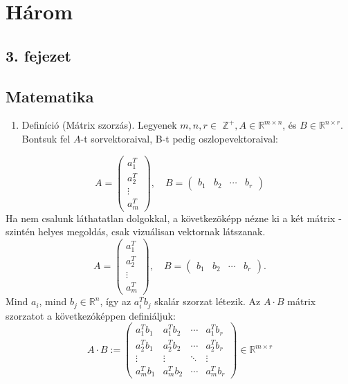 \documentclass[twocolumn]{report}
\theoremstyle{definition} %
\begin{document}
\chapter{Három}

\section{3. fejezet}
\section{Matematika}
\begin{enumerate}
  \item Definíció (Mátrix szorzás). Legyenek $m, n, r \in$ $\mathbb{Z}^{+}, A \in \mathbb{R}^{m \times n}$, és $B \in \mathbb{R}^{n \times r}$. Bontsuk fel $A$-t sorvektoraival, B-t pedig oszlopevektoraival:
\end{enumerate}
$$
A=\left(\begin{array}{c}
a_{1}^{T} \\
a_{2}^{T} \\
\vdots \\
a_{m}^{T}
\end{array}\right), \quad B=\left(\begin{array}{llll}
b_{1} & b_{2} & \cdots & b_{r}
\end{array}\right)
$$
Ha nem csalunk láthatatlan dolgokkal, a következöképp nézne ki a két mátrix - szintén helyes megoldás, csak vizuálisan vektornak látszanak.
$$
A=\left(\begin{array}{c}
a_{1}^{T} \\
a_{2}^{T} \\
\vdots \\
a_{m}^{T}
\end{array}\right), \quad B=\left(\begin{array}{llll}
b_{1} & b_{2} & \cdots & b_{r}
\end{array}\right) .
$$
Mind $a_{i}$, mind $b_{j} \in \mathbb{R}^{n}$, így az $a_{i}^{T} b_{j}$ skalár szorzat létezik. Az $A \cdot B$ mátrix szorzatot a következóképpen definiáljuk:
$$
A \cdot B:=\left(\begin{array}{cccc}
a_{1}^{T} b_{1} & a_{1}^{T} b_{2} & \cdots & a_{1}^{T} b_{r} \\
a_{2}^{T} b_{1} & a_{2}^{T} b_{2} & \cdots & a_{2}^{T} b_{r} \\
\vdots & \vdots & \ddots & \vdots \\
a_{m}^{T} b_{1} & a_{m}^{T} b_{2} & \cdots & a_{m}^{T} b_{r}
\end{array}\right) \in \mathbb{R}^{m \times r}
$$
\end{document}
